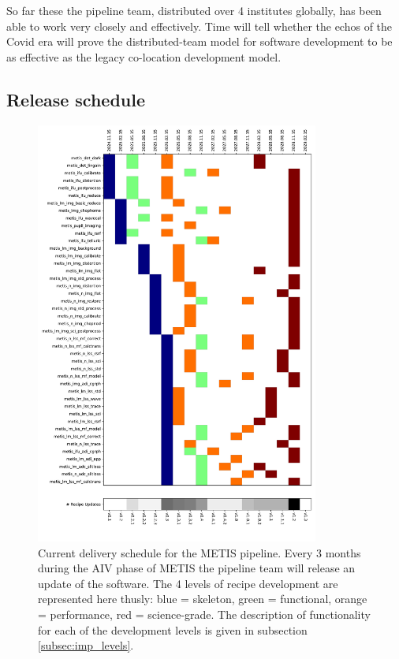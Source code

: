 \documentclass[a4paper]{spie}  %
\begin{document}
So far these the pipeline team, distributed over 4 institutes globally, has been able to work very closely and effectively. 
Time will tell whether the echos of the Covid era will prove the distributed-team model for software development to be as effective as the legacy co-location development model.


\subsection{Release schedule}
\label{subsec:imp_schedule}


\begin{figure}
    \centering
    \includegraphics[width=0.83\textwidth]{SPIE_paper/figures/deliveries_recipes.pdf}
    \caption{Current delivery schedule for the METIS pipeline. Every 3 months during the AIV phase of METIS the pipeline team will release an update of the software. The 4 levels of recipe development are represented here thusly: blue = skeleton, green = functional, orange = performance, red = science-grade. The description of functionality for each of the development levels is given in subsection \ref{subsec:imp_levels}.}
    \label{fig:pip_releases}
\end{figure}
\end{document}
